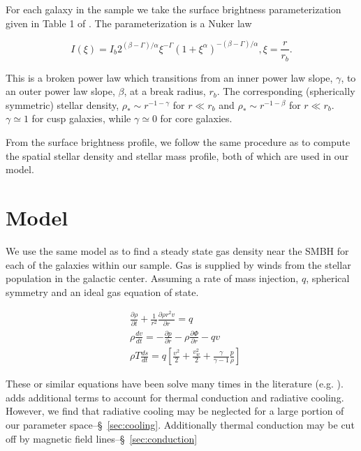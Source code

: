 \documentclass[usenatbib,fleqn]{mn2e}
\newcommand{\rb}{r_b}
\newcommand{\dxdy}[2]{\frac{\partial #1}{\partial #2} }
\newcommand{\drhodt}{\dxdy{\rho}{t}}
\newcommand{\dpdr}{\dxdy{p}{r}}
\newcommand{\dphidr}{\dxdy{\Phi}{r}}
\newcommand{\ke}{\frac{v^2}{2}}
\newcommand{\kew}{\frac{v_w^2}{2}}
\newcommand{\gammaf}{\frac{\gamma}{\gamma-1}}
\newcommand{\cs}{\frac{p}{\rho}}
\newcommand{\rhostar}{\rho_*}
\begin{document}
For each galaxy in the sample we take the surface brightness
parameterization given in Table 1 of
. The parameterization is a Nuker law

\begin{equation}
  I(\xi)=I_b 2^{(\beta-\Gamma)/\alpha} \xi^{-\Gamma} (1+\xi^\alpha)^{-(\beta-\Gamma)/\alpha}, \xi=\frac{r}{r_b}.
\end{equation}

This is a broken power law which transitions from an inner power law
slope, $\gamma$, to an outer power law slope, $\beta$, at a break
radius, $\rb$.  The corresponding (spherically symmetric) stellar
density, $\rhostar\sim r^{-1-\gamma}$ for $r \ll \rb$ and
$\rhostar\sim r^{-1-\beta}$ for $r \ll \rb$.  $\gamma\simeq1$ for cusp
galaxies, while $\gamma\simeq0$ for core galaxies.

From the surface brightness profile, we follow the same procedure as
 to compute the spatial stellar density
and stellar mass profile, both of which are used in our model.


\section{Model}
\label{sec:model}
We use the same model as \citealt{Quataert:2004a} to find a steady
state gas density near the SMBH for each of the galaxies within our
sample.  Gas is supplied by winds from the stellar population in the
galactic center. Assuming a rate of mass injection, $q$, spherical
symmetry and an ideal gas equation of state.

\begin{align}
&\drhodt+\frac{1}{r^2}\dxdy{\rho r^2 v}{r}=q\\
&\rho \frac{dv}{dt}=-\dpdr-\rho \dphidr-q v\\
&\rho T \frac{ds}{dt}=q\left[\ke+\kew+\gammaf \cs \right]
\end{align}

These or similar equations have been solve many times in the
literature (e.g. \citealt{HolzerAxford:1970a,Quataert:2004a,De-ColleGuillochon+:2012a,ShcherbakovWong+:2014a}). \citealt{ShcherbakovWong+:2014a}
adds additional terms to account for thermal conduction and radiative
cooling. However, we find that radiative cooling may be neglected for
a large portion of our parameter space--\S~\ref{sec:cooling}.
Additionally thermal conduction may be cut off by magnetic field
lines--\S~\ref{sec:conduction}
\end{document}
